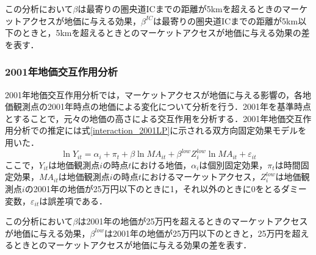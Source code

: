 この分析において$\beta$は最寄りの圏央道ICまでの距離が5kmを超えるときのマーケットアクセスが地価に与える効果，$\beta^{IC}$は最寄りの圏央道ICまでの距離が5km以下のときと，5kmを超えるときとのマーケットアクセスが地価に与える効果の差を表す．
\subsubsection{2001年地価交互作用分析}
2001年地価交互作用分析では，マーケットアクセスが地価に与える影響の，各地価観測点の2001年時点の地価による変化について分析を行う．2001年を基準時点とすることで，元々の地価の高さによる交互作用を分析する．2001年地価交互作用分析での推定には式\ref{interaction_2001LP}に示される双方向固定効果モデルを用いた．
\begin{equation}
  \ln{Y_{it}} = \alpha_{i} + \pi_{t} + \beta\ln{MA_{it}} + \beta^{low}Z^{low}_{i}\ln{MA_{it}} + \varepsilon_{it}
  \label{interaction_2001LP}
\end{equation}
ここで，$Y_{it}$は地価観測点$i$の時点$t$における地価，$\alpha_{i}$は個別固定効果，$\pi_{t}$は時間固定効果，$MA_{it}$は地価観測点$i$の時点$t$におけるマーケットアクセス，$Z^{low}_{i}$は地価観測点$i$の2001年の地価が25万円以下のときに1，それ以外のときに0をとるダミー変数，$\varepsilon_{it}$は誤差項である．

この分析において$\beta$は2001年の地価が25万円を超えるときのマーケットアクセスが地価に与える効果，$\beta^{low}$は2001年の地価が25万円以下のときと，25万円を超えるときとのマーケットアクセスが地価に与える効果の差を表す．
